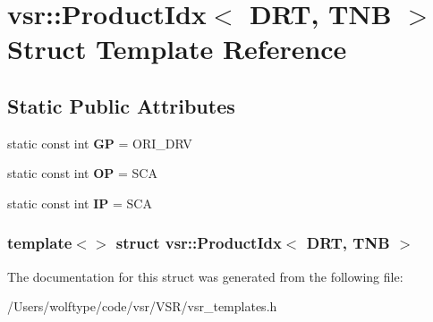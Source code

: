 \hypertarget{structvsr_1_1_product_idx_3_01_d_r_t_00_01_t_n_b_01_4}{\section{vsr\-:\-:Product\-Idx$<$ D\-R\-T, T\-N\-B $>$ Struct Template Reference}
\label{structvsr_1_1_product_idx_3_01_d_r_t_00_01_t_n_b_01_4}
}
\subsection*{Static Public Attributes}
\begin{DoxyCompactItemize}
\item 
\hypertarget{structvsr_1_1_product_idx_3_01_d_r_t_00_01_t_n_b_01_4_a18f34f6afd84759dcbe66125d1d4fc7b}{static const int {\bfseries G\-P} = O\-R\-I\-\_\-\-D\-R\-V}\label{structvsr_1_1_product_idx_3_01_d_r_t_00_01_t_n_b_01_4_a18f34f6afd84759dcbe66125d1d4fc7b}

\item 
\hypertarget{structvsr_1_1_product_idx_3_01_d_r_t_00_01_t_n_b_01_4_a0bf3db87791aa4ef2cf397827280a97c}{static const int {\bfseries O\-P} = S\-C\-A}\label{structvsr_1_1_product_idx_3_01_d_r_t_00_01_t_n_b_01_4_a0bf3db87791aa4ef2cf397827280a97c}

\item 
\hypertarget{structvsr_1_1_product_idx_3_01_d_r_t_00_01_t_n_b_01_4_a03f281aa62a581fb7ce013679f01cd82}{static const int {\bfseries I\-P} = S\-C\-A}\label{structvsr_1_1_product_idx_3_01_d_r_t_00_01_t_n_b_01_4_a03f281aa62a581fb7ce013679f01cd82}

\end{DoxyCompactItemize}
\subsubsection*{template$<$$>$ struct vsr\-::\-Product\-Idx$<$ D\-R\-T, T\-N\-B $>$}



The documentation for this struct was generated from the following file\-:\begin{DoxyCompactItemize}
\item 
/\-Users/wolftype/code/vsr/\-V\-S\-R/vsr\-\_\-templates.\-h\end{DoxyCompactItemize}
